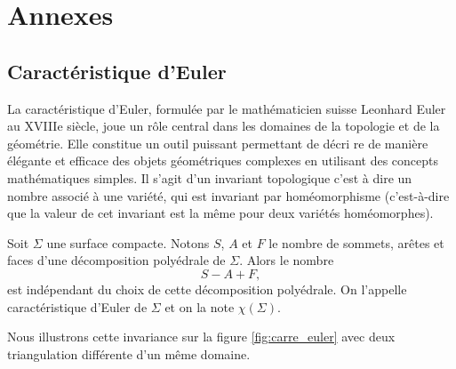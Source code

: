 \chapter{Annexes}
\label{chap:annexes}

\section{Caractéristique d'Euler}

La caractéristique d'Euler, formulée par le mathématicien suisse Leonhard Euler au XVIIIe siècle, joue un rôle central dans les domaines de la topologie et de la géométrie. Elle constitue un outil puissant permettant de décri re de manière élégante et efficace des objets géométriques complexes en utilisant des concepts mathématiques simples. Il s'agit d'un invariant topologique c'est à dire un nombre associé à une variété, qui est invariant par homéomorphisme (c’est-à-dire que la valeur de cet invariant est la même pour deux variétés homéomorphes).

\begin{definition}
Soit $\Sigma$ une surface compacte. Notons $S$, $A$ et $F$ le nombre de sommets, arêtes et faces d'une décomposition polyédrale de $\Sigma$. Alors le nombre
$$
S-A+F,
$$
est indépendant du choix de cette décomposition polyédrale. On l’appelle caractéristique d’Euler de $\Sigma$ et on la note $\chi(\Sigma)$.
\end{definition}

Nous illustrons cette invariance sur la figure \ref{fig:carre_euler} avec deux triangulation différente d'un même domaine.


